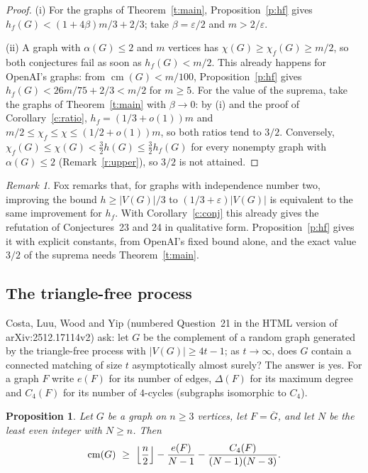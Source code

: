 \documentclass[11pt]{article}
\newtheorem{proposition}[theorem]{Proposition}
\theoremstyle{definition}\newtheorem{conjecture}[theorem]{Conjecture}
\theoremstyle{remark}\newtheorem{remark}[theorem]{Remark}
\newcommand{\cm}{\operatorname{cm}}
\newcommand{\eps}{\varepsilon}
\begin{document}
\begin{proof}
(i) For the graphs of Theorem~\ref{t:main}, Proposition~\ref{p:hf} gives $h_f(G)<(1+4\beta)m/3+2/3$; take $\beta=\eps/2$ and
$m>2/\eps$.

(ii) A graph with $\alpha(G)\le2$ and $m$ vertices has $\chi(G)\ge\chi_f(G)\ge m/2$, so both conjectures fail as soon as
$h_f(G)<m/2$. This already happens for OpenAI's graphs: from $\cm(G)<m/100$, Proposition~\ref{p:hf} gives
$h_f(G)<26m/75+2/3<m/2$ for $m\ge5$. For the value of the suprema, take the graphs of Theorem~\ref{t:main} with
$\beta\to0$: by (i) and the proof of Corollary~\ref{c:ratio}, $h_f=(1/3+o(1))m$ and $m/2\le\chi_f\le\chi\le(1/2+o(1))m$, so
both ratios tend to $3/2$. Conversely, $\chi_f(G)\le\chi(G)<\frac32h(G)\le\frac32h_f(G)$ for every nonempty graph with
$\alpha(G)\le2$ (Remark~\ref{r:upper}), so $3/2$ is not attained.
\end{proof}

\begin{remark}
Fox \cite[Section~4]{Fox11} remarks that, for graphs with independence number two, improving the bound $h\ge|V(G)|/3$ to
$(1/3+\eps)|V(G)|$ is equivalent to the same improvement for $h_f$. With Corollary~\ref{c:conj} this already gives the
refutation of Conjectures~23 and 24 in qualitative form. Proposition~\ref{p:hf} gives it with explicit constants, from
OpenAI's fixed bound alone, and the exact value $3/2$ of the suprema needs Theorem~\ref{t:main}.
\end{remark}

\subsection{The triangle-free process}
Costa, Luu, Wood and Yip \cite[Question~4.8]{CLWY} (numbered Question~21 in the HTML version of arXiv:2512.17114v2) ask: let
$G$ be the complement of a random graph generated by the triangle-free process with $|V(G)|\ge4t-1$; as $t\to\infty$, does
$G$ contain a connected matching of size $t$ asymptotically almost surely? The answer is yes. For a graph $F$ write $e(F)$ for
its number of edges, $\Delta(F)$ for its maximum degree and $C_4(F)$ for its number of $4$-cycles (subgraphs isomorphic to
$C_4$).

\begin{proposition}\label{p:pairing}
Let $G$ be a graph on $n\ge3$ vertices, let $F=\overline G$, and let $N$ be the least even integer with $N\ge n$. Then
\[
 \cm(G)\ \ge\ \Bigl\lfloor\frac n2\Bigr\rfloor-\frac{e(F)}{N-1}-\frac{C_4(F)}{(N-1)(N-3)} .
\]
\end{proposition}
\end{document}
